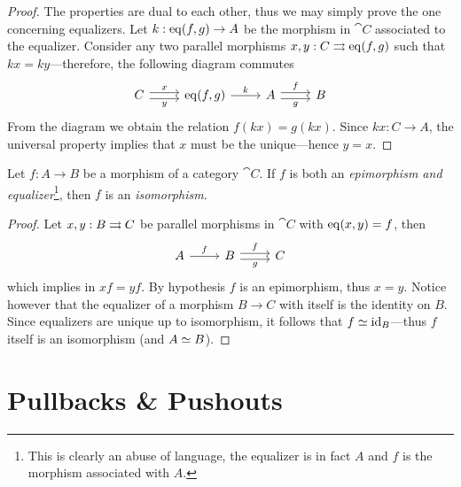 \begin{proof}
    The properties are dual to each other, thus we may simply prove the one
    concerning equalizers. Let \(k: \operatorname{eq}(f, g) \to A\) be the morphism in \(\cat C\)
    associated to the equalizer. Consider any two parallel morphisms \(x, y: C \rightrightarrows
    \operatorname{eq}(f, g)\) such that \(k x = k y\)---therefore, the following diagram
    commutes
    \[
        \begin{tikzcd}
            C \ar[r, shift left, "x"] \ar[r, shift right, "y"']
            & \Eq(f, g) \ar[r, "k"]
            & A \ar[r, shift left, "f"] \ar[r, shift right, "g"']
            & B
        \end{tikzcd}
    \]
    From the diagram we obtain the relation \(f (k x) = g (k x)\). Since \(k x: C
    \to A\), the universal property implies that \(x\) must be the unique---hence
    \(y = x\).
\end{proof}

\begin{proposition}
    \label{prop:epi-and-eq-is-iso}
    Let \(f: A \to B\) be a morphism of a category \(\cat C\). If \(f\) is both an
    \emph{epimorphism and equalizer}\footnote{This is clearly an abuse of language,
        the equalizer is in fact \(A\) and \(f\) is the morphism associated with
        \(A\).}, then \(f\) is an \emph{isomorphism}.
\end{proposition}

\begin{proof}
    Let \(x, y: B \rightrightarrows C\) be parallel morphisms in \(\cat C\) with \(\operatorname{eq}(x, y) =
    f\), then
    \[
        \begin{tikzcd}
            A \ar[r, "f"] & B \ar[r, shift right, "g"'] \ar[r, shift left, "f"] &C
        \end{tikzcd}
    \]
    which implies in \(x f = y f\). By hypothesis \(f\) is an epimorphism, thus
    \(x = y\). Notice however that the equalizer of a morphism \(B \to C\) with
    itself is the identity on \(B\). Since equalizers are unique up to isomorphism,
    it follows that \(f \simeq \operatorname{id}_B\)---thus \(f\) itself is an isomorphism (and
    \(A \simeq B\)).
\end{proof}

\section{Pullbacks \& Pushouts}

